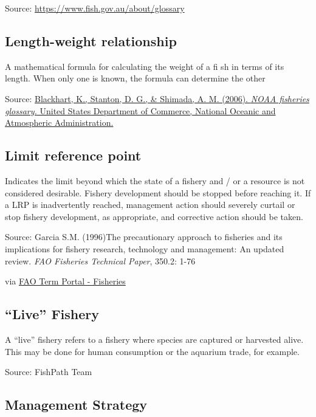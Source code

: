 \documentclass[
  11pt,
]{book}
\begin{document}
Source: \url{https://www.fish.gov.au/about/glossary}

\hypertarget{length-weight-relationship}{%
\subsection{Length-weight relationship}\label{length-weight-relationship}}

A mathematical formula for calculating the weight of a ﬁ sh in terms of its length. When only one is known, the formula can determine the other

Source: \href{https://repository.library.noaa.gov/view/noaa/12856}{Blackhart, K., Stanton, D. G., \& Shimada, A. M. (2006). \emph{NOAA fisheries glossary.} United States Department of Commerce, National Oceanic and Atmospheric Administration.}

\hypertarget{limit-reference-point}{%
\subsection{Limit reference point}\label{limit-reference-point}}

Indicates the limit beyond which the state of a fishery and / or a resource is not considered desirable. Fishery development should be stopped before reaching it. If a LRP is inadvertently reached, management action should severely curtail or stop fishery development, as appropriate, and corrective action should be taken.

Source: Garcia S.M. (1996)The precautionary approach to fisheries and its implications for fishery research, technology and management: An updated review. \emph{FAO Fisheries Technical Paper}, 350.2: 1-76

via \href{http://www.fao.org/fishery/glossary/en}{FAO Term Portal - Fisheries}

\hypertarget{live-fishery}{%
\subsection{``Live'' Fishery}\label{live-fishery}}

A ``live'' fishery refers to a fishery where species are captured or harvested alive. This may be done for human consumption or the aquarium trade, for example.

Source: FishPath Team

\hypertarget{management-strategy}{%
\subsection{Management Strategy}\label{management-strategy}}
\end{document}
